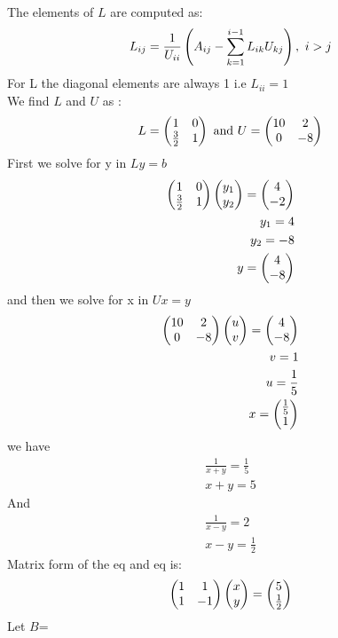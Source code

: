 \documentclass{beamer}
\begin{document}
\begin{frame}
\begin{align}
\end{align}
The elements of $L$ are computed as:
\begin{align}
    L_{ij}=\frac{1}{U_{ii}}\left(A_{ij}-\sum_{k=1}^{i-1}L_{ik}U_{kj}\right), \text{ } i>j
\end{align}
For L the diagonal elements are always 1 i.e $L_{ii}=1$\\
We find $L$ and $U$ as :
\begin{align}
    L=\begin{pmatrix}1 & 0 \\ \frac{3}{2} & 1\end{pmatrix} \text{ and } U=\begin{pmatrix}10 & 2 \\ 0 & -8\end{pmatrix}
\end{align}
First we solve for y in  $Ly=b$\\ 
\begin{align}
    \begin{pmatrix}1 & 0 \\ \frac{3}{2} & 1\end{pmatrix}\begin{pmatrix}y_1 \\ y_2\end{pmatrix}=\begin{pmatrix}4\\-2\end{pmatrix}\\
    y_1=4\\y_2=-8\\ y=\begin{pmatrix}4 \\ -8\end{pmatrix}
\end{align}
and then we solve for x in $Ux=y$\\
\begin{align}
    \begin{pmatrix}10 & 2 \\ 0 & -8\end{pmatrix}\begin{pmatrix}u \\ v\end{pmatrix} = \begin{pmatrix}4 \\ -8\end{pmatrix}\\
    v=1\\u=\frac{1}{5}\\ x=\begin{pmatrix}\frac{1}{5} \\ 1\end{pmatrix}
\end{align}
we have 
\begin{align}
    \frac{1}{x+y}=\frac{1}{5}\\
    x+y=5
\end{align}
And
\begin{align}
    \frac{1}{x-y}=2\\x-y=\frac{1}{2}
\end{align}
Matrix form of the eq and eq is:
\begin{align}
    \begin{pmatrix}1 & 1 \\ 1 & -1\end{pmatrix}\begin{pmatrix}x\\y\end{pmatrix}=\begin{pmatrix}5 \\ \frac{1}{2}\end{pmatrix}
\end{align}
Let $B$=\\

\end{frame}
\end{document}
